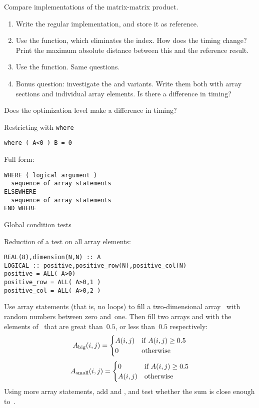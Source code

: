 
\begin{exercise}
  \label{ex:fmatmul}
  Compare implementations of the matrix-matrix product.
  \begin{enumerate}
  \item Write the regular  implementation, and store it as
    reference.
  \item Use the  function, which eliminates the 
    index. How does the timing change? Print the maximum absolute
    distance between this and the reference result.
  \item Use the  function. Same questions.
  \item Bonus question: investigate the  and 
    variants. Write them both with array sections and individual array
    elements. Is there a difference in timing?
  \end{enumerate}
  Does the optimization level make a difference in timing?
\end{exercise}

 {Restricting with \tt{where}}

\begin{verbatim}
where ( A<0 ) B = 0
\end{verbatim}

Full form:
\begin{verbatim}
WHERE ( logical argument )
  sequence of array statements
ELSEWHERE
  sequence of array statements
END WHERE
\end{verbatim}

 {Global condition tests}

Reduction of a test on all array elements:
\begin{verbatim}
REAL(8),dimension(N,N) :: A
LOGICAL :: positive,positive_row(N),positive_col(N)
positive = ALL( A>0)
positive_row = ALL( A>0,1 )
positive_col = ALL( A>0,2 )
\end{verbatim}

\begin{exercise}
  Use array statements (that is, no loops) to fill a two-dimensional
  array~ with random numbers between zero and~one. Then fill two
  arrays  and  with the elements of~ that are
  great than~$0.5$, or less than~$0.5$ respectively:
  \[ A_{\scriptstyle\mathrm{big}}(i,j) =
  \begin{cases}
    A(i,j)&\hbox{if $A(i,j)\geq 0.5$}\\ 0&\hbox{otherwise}
  \end{cases}
  \]
  \[ A_{\scriptstyle\mathrm{small}}(i,j) =
  \begin{cases}
    0&\hbox{if $A(i,j)\geq 0.5$}\\ A(i,j)&\hbox{otherwise}
  \end{cases}
  \]
  Using more array statements, add  and , and test
  whether the sum is close enough to~.
\end{exercise}

